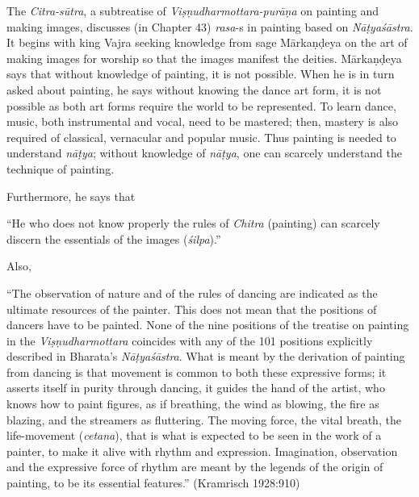 The \textsl{Citra-sūtra}, a subtreatise of \textsl{Viṣṇudharmottara-purāṇa} on painting and making images, discusses (in Chapter 43) \textsl{rasa}-s in painting based on \textsl{Nāṭyaśāstra}. It begins with king Vajra seeking knowledge from sage Mārkaṇḍeya on the art of making images for worship so that the images manifest the deities. Mārkaṇḍeya says that without knowledge of painting, it is not possible. When he is in turn asked about painting, he says without knowing the dance art form, it is not possible as both art forms require the world to be represented. To learn dance, music, both instrumental and vocal, need to be mastered; then, mastery is also required of classical, vernacular and popular music. Thus painting is needed to understand \textsl{nāṭya}; without knowledge of \textsl{nāṭya}, one can scarcely understand the technique of painting. 

Furthermore, he says that

\begin{myquote}
“He who does not know properly the rules of \textsl{Chitra} (painting) can scarcely discern the essentials of the images (\textsl{śilpa}).” 

Also, 

“The observation of nature and of the rules of dancing are indicated as the ultimate resources of the painter. This does not mean that the positions of dancers have to be painted. None of the nine positions of the treatise on painting in the \textsl{Viṣṇudharmottara} coincides with any of the 101 positions explicitly described in Bharata's \textsl{Nāṭyaśāstra}. What is meant by the derivation of painting from dancing is that movement is common to both these expressive forms; it asserts itself in purity through dancing, it guides the hand of the artist, who knows how to paint figures, as if breathing, the wind as blowing, the fire as blazing, and the streamers as fluttering. The moving force, the vital breath, the life-movement (\textsl{cetana}), that is what is expected to be seen in the work of a painter, to make it alive with rhythm and expression. Imagination, observation and the expressive force of rhythm are meant by the legends of the origin of painting, to be its essential features.” \hfill (Kramrisch 1928:910)
\end{myquote}

